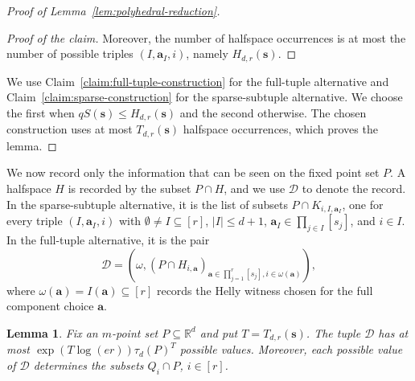 \documentclass[11pt]{article}
\newtheorem{lemma}[theorem]{Lemma}
\theoremstyle{definition}
\newenvironment{poc}{\begin{proof}[Proof of the claim]\renewcommand*{\qedsymbol}{\(\blacksquare\)}}{\end{proof}}
\newcommand*{\abs}[1]{\lvert#1\rvert}
\newcommand{\R}{\mathbb{R}}
\begin{document}
\begin{proof}[Proof of Lemma~\ref{lem:polyhedral-reduction}]
\begin{poc}
Moreover, the number of halfspace occurrences is at most the number of possible triples \((I,\boldsymbol{a}_{I},i)\), namely \(H_{d,r}(\boldsymbol{s})\).
\end{poc}
We use Claim~\ref{claim:full-tuple-construction} for the full-tuple alternative and Claim~\ref{claim:sparse-construction} for the sparse-subtuple alternative. We choose the first when \(qS(\boldsymbol{s})\le H_{d,r}(\boldsymbol{s})\) and the second otherwise. The chosen construction uses at most \(T_{d,r}(\boldsymbol{s})\) halfspace occurrences, which proves the lemma.
\end{proof}
We now record only the information that can be seen on the fixed point set \(P\). A halfspace \(H\) is recorded by the subset \(P\cap H\), and we use \(\mathcal{D}\) to denote the record. In the sparse-subtuple alternative, it is the list of subsets \(P\cap K_{i,I,\boldsymbol{a}_{I}}\), one for every triple \((I,\boldsymbol{a}_{I},i)\) with \(\emptyset\ne I\subseteq [r]\), \(\abs{I}\le d+1\), \(\boldsymbol{a}_{I}\in\prod_{j\in I}[s_{j}]\), and \(i\in I\). In the full-tuple alternative, it is the pair
\[
\mathcal{D}=\left(\omega,\left(P\cap H_{i,\boldsymbol{a}}\right)_{\boldsymbol{a}\in\prod_{j=1}^{r}[s_{j}],i\in\omega(\boldsymbol{a})}\right),
\]
where \(\omega(\boldsymbol{a})=I(\boldsymbol{a})\subseteq [r]\) records the Helly witness chosen for the full component choice \(\boldsymbol{a}\).
\begin{lemma}\label{lem:pattern-count}
Fix an \(m\)-point set \(P\subseteq\R^{d}\) and put \(T=T_{d,r}(\boldsymbol{s})\). The tuple \(\mathcal{D}\) has at most \(\exp(T\log(er))\tau_{d}(P)^{T}\) possible values. Moreover, each possible value of \(\mathcal{D}\) determines the subsets \(Q_{i}\cap P\), \(i\in [r]\).
\end{lemma}
\end{document}
